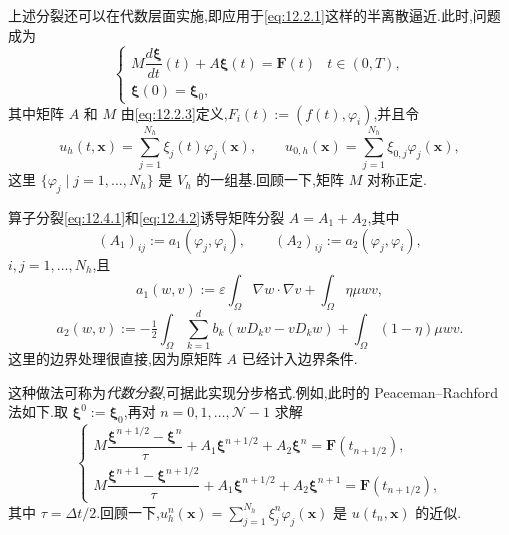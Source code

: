 上述分裂还可以在代数层面实施,即应用于\eqref{eq:12.2.1}这样的半离散逼近.此时,问题成为
\begin{equation}\label{eq:12.4.7}
  \begin{cases}
    M\dfrac{d\boldsymbol{\xi}}{dt}(t)+A\boldsymbol{\xi}(t)=\boldsymbol{F}(t)
        & t\in(0,T),\\[2pt]
    \boldsymbol{\xi}(0)=\boldsymbol{\xi}_0,
  \end{cases}
\end{equation}
其中矩阵 \(A\) 和 \(M\) 由\eqref{eq:12.2.3}定义,\(F_i(t):=(f(t),\varphi_i)\),并且令
\[
  u_h(t,\boldsymbol{x})=\sum_{j=1}^{N_h}\xi_j(t)\varphi_j(\boldsymbol{x}),\qquad
  u_{0,h}(\boldsymbol{x})=\sum_{j=1}^{N_h}\xi_{0,j}\varphi_j(\boldsymbol{x}),
\]
这里 \(\{\varphi_j\mid j=1,\ldots,N_h\}\) 是 \(V_h\) 的一组基.回顾一下,矩阵 \(M\) 对称正定.

算子分裂\eqref{eq:12.4.1}和\eqref{eq:12.4.2}诱导矩阵分裂 \(A=A_1+A_2\),其中
\begin{equation}\label{eq:12.4.8}
  (A_1)_{ij}:=a_1(\varphi_j,\varphi_i),\qquad
  (A_2)_{ij}:=a_2(\varphi_j,\varphi_i),
\end{equation}
\(i,j=1,\ldots,N_h\),且
\begin{equation}\label{eq:12.4.9}
  a_1(w,v):=\varepsilon\int_\Omega\nabla w\cdot\nabla v+\int_\Omega\eta\mu wv,
\end{equation}
\begin{equation}\label{eq:12.4.10}
  a_2(w,v):=-\tfrac12\int_\Omega\sum_{k=1}^d b_k(wD_kv-vD_kw)
    +\int_\Omega(1-\eta)\mu wv.
\end{equation}
这里的边界处理很直接,因为原矩阵 \(A\) 已经计入边界条件.

这种做法可称为\emph{代数分裂},可据此实现分步格式.例如,此时的 Peaceman--Rachford 法如下.取 \(\boldsymbol{\xi}^0:=\boldsymbol{\xi}_0\),再对 \(n=0,1,\ldots,\mathcal N-1\) 求解
\begin{equation}\label{eq:12.4.11}
  \begin{cases}
    M\dfrac{\boldsymbol{\xi}^{n+1/2}-\boldsymbol{\xi}^n}{\tau}
      +A_1\boldsymbol{\xi}^{n+1/2}+A_2\boldsymbol{\xi}^n=\boldsymbol{F}(t_{n+1/2}),\\[4pt]
    M\dfrac{\boldsymbol{\xi}^{n+1}-\boldsymbol{\xi}^{n+1/2}}{\tau}
      +A_1\boldsymbol{\xi}^{n+1/2}+A_2\boldsymbol{\xi}^{n+1}=\boldsymbol{F}(t_{n+1/2}),
  \end{cases}
\end{equation}
其中 \(\tau=\Delta t/2\).回顾一下,\(u_h^n(\boldsymbol{x})=\sum_{j=1}^{N_h}\xi_j^n\varphi_j(\boldsymbol{x})\) 是 \(u(t_n,\boldsymbol{x})\) 的近似.

